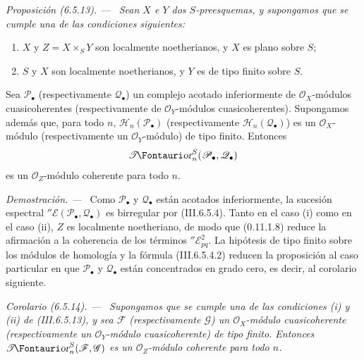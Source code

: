 \documentclass[10pt,oneside]{book}
\makeatletter
\newcommand{\sh}[1]{\mathscr{#1}}
\newcommand*{\ega@sheafop}[3]{\sh{#1}#2\textup{\kern-2.2pt{\Fontauri\slshape #3}}}
\newcommand{\shTor}{\ega@sheafop{T}{}{or}}
\newcommand{\sref}[2][]{\textup{(#2)}}
\newenvironment{proposition}[1][]{\par\medskip\noindent\itshape Proposición (#1). ---\ }{\par}
\newenvironment{corollary}[1][]{\par\medskip\noindent\itshape Corolario (#1). ---\ }{\par}
\newenvironment{proof}{\par\medskip\noindent\textit{Demostración. ---\ }}{\par}
\makeatother
\begin{document}
\begin{proposition}[6.5.13]
\label{III.6.5.13}
Sean $X$ e $Y$ dos $S$-preesquemas, y supongamos que se cumple
una de las condiciones siguientes:
\begin{enumerate}
  \item[\textup{(i)}] $X$ y $Z=X\times_SY$ son localmente noetherianos, y
    $X$ es plano sobre $S$;
  \item[\textup{(ii)}] $S$ y $X$ son localmente noetherianos, y $Y$ es de
    tipo finito sobre $S$.
\end{enumerate}
Sea $\sh P_\bullet$ \textup{(respectivamente} $\sh Q_\bullet$) un complejo
acotado inferiormente de $\sh O_X$-módulos cuasicoherentes
\textup{(respectivamente} de $\sh O_Y$-módulos cuasicoherentes).
Supongamos además que, para todo $n$,
$\sh H_n(\sh P_\bullet)$ \textup{(respectivamente}
$\sh H_n(\sh Q_\bullet)$) es un $\sh O_X$-módulo
\textup{(respectivamente} un $\sh O_Y$-módulo) de tipo finito. Entonces
\[
  \shTor_n^S(\sh P_\bullet,\sh Q_\bullet)
\]
es un $\sh O_Z$-módulo coherente para todo $n$.
\end{proposition}

\begin{proof}
Como $\sh P_\bullet$ y $\sh Q_\bullet$ están acotados
inferiormente, la sucesión espectral
$''\sh E(\sh P_\bullet,\sh Q_\bullet)$ es birregular por
\sref{III.6.5.4}. Tanto en el caso (i) como en el caso (ii), $Z$
es localmente noetheriano, de modo que \sref[0]{0.11.1.8} reduce
la afirmación a la coherencia de los términos
$''\sh E_{pq}^2$. La hipótesis de tipo finito sobre los módulos de
homología y la fórmula \sref{III.6.5.4.2} reducen la proposición
al caso particular en que $\sh P_\bullet$ y $\sh Q_\bullet$ están
concentrados en grado cero, es decir, al corolario siguiente.
\end{proof}

\begin{corollary}[6.5.14]
\label{III.6.5.14}
Supongamos que se cumple una de las condiciones \emph{(i)} y
\emph{(ii)} de \sref{III.6.5.13}, y sea $\sh F$
\textup{(respectivamente} $\sh G$) un $\sh O_X$-módulo cuasicoherente
\textup{(respectivamente} un $\sh O_Y$-módulo cuasicoherente) de tipo
finito. Entonces $\shTor_n^S(\sh F,\sh G)$ es un
$\sh O_Z$-módulo coherente para todo $n$.
\end{corollary}
\end{document}
